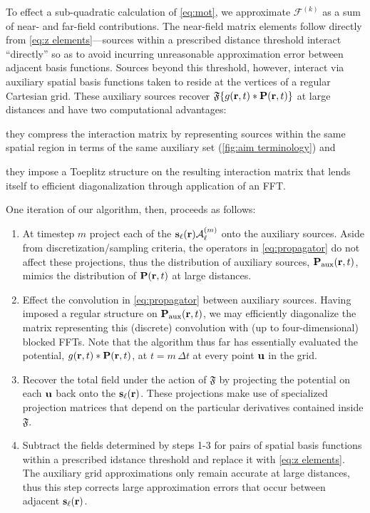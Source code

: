 To effect a sub-quadratic calculation of \cref{eq:mot}, we approximate $\mathcal{F}^{(k)}$ as a sum of near- and far-field contributions.
The near-field matrix elements follow directly from \cref{eq:z elements}---sources within a prescribed distance threshold interact ``directly'' so as to avoid incurring unreasonable approximation error between adjacent basis functions.
Sources beyond this threshold, however, interact via auxiliary spatial basis functions taken to reside at the vertices of a regular Cartesian grid.
These auxiliary sources recover $\mathfrak{F}\qty{g(\vb{r}, t) \ast \vb{P}(\vb{r}, t)}$ at large distances and have two computational advantages:
\begin{inparaenum}[(i)]
  \item they compress the interaction matrix by representing sources within the same spatial region in terms of the same auxiliary set (\cref{fig:aim terminology}) and
  \item they impose a Toeplitz structure on the resulting interaction matrix that lends itself to efficient diagonalization through application of an FFT.
\end{inparaenum}
One iteration of our algorithm, then, proceeds as follows:
\begin{enumerate}
  \item At timestep $m$ project each of the $\vb{s}_\ell(\vb{r}) \mathcal{A}^\qty(m)_\ell$ onto the auxiliary sources.
    Aside from discretization/sampling criteria, the operators in \cref{eq:propagator} do not affect these projections, thus the distribution of auxiliary sources, $\vb{P}_\text{aux}(\vb{r}, t)$, mimics the distribution of $\vb{P}(\vb{r}, t)$ at large distances.
  \item Effect the convolution in \cref{eq:propagator} between auxiliary sources.
    Having imposed a regular structure on $\vb{P}_\text{aux}(\vb{r}, t)$, we may efficiently diagonalize the matrix representing this (discrete) convolution with (up to four-dimensional) blocked FFTs.
    Note that the algorithm thus far has essentially evaluated the potential, $g(\vb{r}, t) \ast \vb{P}(\vb{r}, t)$, at $t = m \, \Delta t$ at every point $\vb{u}$ in the grid.
  \item Recover the total field under the action of $\mathfrak{F}$ by projecting the potential on each $\vb{u}$ back onto the $\vb{s}_\ell(\vb{r})$.
    These projections make use of specialized projection matrices that depend on the particular derivatives contained inside $\mathfrak{F}$.
  \item Subtract the fields determined by steps 1-3 for pairs of spatial basis functions within a prescribed idstance threshold and replace it with \cref{eq:z elements}.
    The auxiliary grid approximations only remain accurate at large distances, thus this step corrects large approximation errors that occur between adjacent $\vb{s}_\ell(\vb{r})$.
\end{enumerate}
